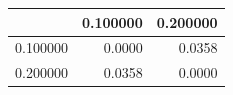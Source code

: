 \begin{tabular}{lrr}
\toprule
 & 0.100000 & 0.200000 \\
\midrule
0.100000 & 0.0000 & 0.0358 \\
0.200000 & 0.0358 & 0.0000 \\
\bottomrule
\end{tabular}
